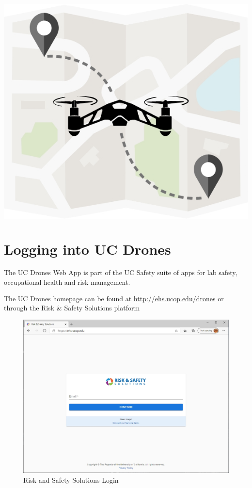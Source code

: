 \documentclass[
  12pt,
]{book}
\begin{document}
\href{http://ehs.ucop.edu/drones}{\includegraphics{images/UCDrones_logo.jpg}}

\hypertarget{UCdrones-login}{%
\section{Logging into UC Drones}\label{UCdrones-login}}

The UC Drones Web App is part of the UC Safety suite of apps for lab safety, occupational health and risk management.

The UC Drones homepage can be found at \url{http://ehs.ucop.edu/drones} or through the Risk \& Safety Solutions platform

\begin{figure}

{\centering \includegraphics[width=0.85\linewidth]{images/RSS_home} 

}

\caption{Risk and Safety Solutions Login}\label{fig:rss-web}
\end{figure}
\end{document}
